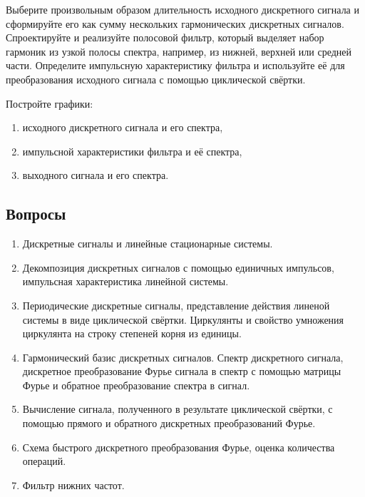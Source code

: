 \documentclass[a4paper,12pt]{article}
\begin{document}
Выберите произвольным образом длительность исходного дискретного сигнала и сформируйте его как сумму нескольких гармонических дискретных
сигналов. Спроектируйте и реализуйте полосовой фильтр, который выделяет набор гармоник из узкой полосы спектра, например, из нижней, верхней
или средней части. Определите импульсную характеристику фильтра и используйте её для преобразования исходного сигнала с помощью циклической
свёртки.

Постройте графики:
\begin{enumerate}
    \item исходного дискретного сигнала и его спектра,
    \item импульсной характеристики фильтра и её спектра,
    \item выходного сигнала и его спектра.
\end{enumerate}

\subsection{Вопросы}

\begin{enumerate}
    \item Дискретные сигналы и линейные стационарные системы.
    \item Декомпозиция дискретных сигналов с помощью единичных импульсов, импульсная характеристика линейной системы.
    \item Периодические дискретные сигналы, представление действия линеной системы в виде циклической свёртки. Циркулянты и свойство
        умножения циркулянта на строку степеней корня из единицы.
    \item Гармонический базис дискретных сигналов. Спектр дискретного сигнала, дискретное преобразование Фурье сигнала в спектр с помощью
        матрицы Фурье и обратное преобразование спектра в сигнал.
    \item Вычисление сигнала, полученного в результате циклической свёртки, с помощью прямого и обратного дискретных преобразований Фурье.
    \item Схема быстрого дискретного преобразования Фурье, оценка количества операций.
    \item Фильтр нижних частот.
\end{enumerate}
\end{document}
